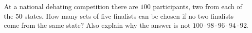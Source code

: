 At a national debating competition there are $100$ participants, two from each of the $50$ states. How many sets of five finalists can be chosen if no two finalists come from the same state? Also explain why the answer is not $100\cdot98\cdot96\cdot94\cdot92$.

